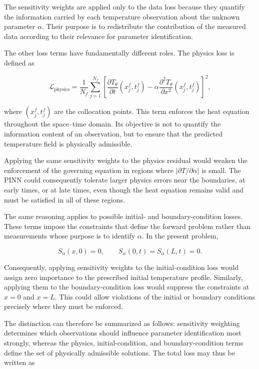 The sensitivity weights are applied only to the data loss because they quantify
the information carried by each temperature observation about the unknown
parameter $\alpha$. Their purpose is to redistribute the contribution of the
measured data according to their relevance for parameter identification.

The other loss terms have fundamentally different roles. The physics loss is
defined as

\begin{equation}
\mathcal{L}_{\mathrm{physics}}
=
\frac{1}{N_f}
\sum_{j=1}^{N_f}
\left[
\frac{\partial T_{\theta}}{\partial t}(x_j^f,t_j^f)
-
\alpha
\frac{\partial^2T_{\theta}}{\partial x^2}(x_j^f,t_j^f)
\right]^2,
\end{equation}

where $(x_j^f,t_j^f)$ are the collocation points. This term enforces the heat
equation throughout the space--time domain. Its objective is not to quantify the
information content of an observation, but to ensure that the predicted
temperature field is physically admissible.

Applying the same sensitivity weights to the physics residual would weaken the
enforcement of the governing equation in regions where
$|\partial T/\partial\alpha|$ is small. The PINN could consequently tolerate
larger physics errors near the boundaries, at early times, or at late times, even
though the heat equation remains valid and must be satisfied in all of these
regions.

The same reasoning applies to possible initial- and boundary-condition losses.
These terms impose the constraints that define the forward problem rather than
measurements whose purpose is to identify $\alpha$. In the present problem,

\begin{equation}
S_{\alpha}(x,0)=0,
\qquad
S_{\alpha}(0,t)=S_{\alpha}(L,t)=0.
\end{equation}

Consequently, applying sensitivity weights to the initial-condition loss would
assign zero importance to the prescribed initial temperature profile. Similarly,
applying them to the boundary-condition loss would suppress the constraints at
$x=0$ and $x=L$. This could allow violations of the initial or boundary
conditions precisely where they must be enforced.

The distinction can therefore be summarized as follows: sensitivity weighting
determines which observations should influence parameter identification most
strongly, whereas the physics, initial-condition, and boundary-condition terms
define the set of physically admissible solutions. The total loss may thus be
written as

